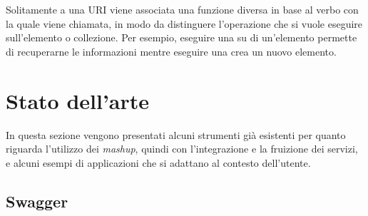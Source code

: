 Solitamente a una URI viene associata una funzione diversa in base al verbo con la quale viene chiamata, in modo da distinguere l'operazione che si vuole eseguire sull'elemento o collezione. Per esempio, eseguire una  su di un'elemento permette di recuperarne le informazioni mentre eseguire una  crea un nuovo elemento.


\section{Stato dell'arte\label{sec:stato-arte}}

In questa sezione vengono presentati alcuni strumenti già esistenti per quanto riguarda l'utilizzo dei \emph{mashup}, quindi con l'integrazione e la fruizione dei servizi, e alcuni esempi di applicazioni che si adattano al contesto dell'utente.

\subsection*{Swagger}

